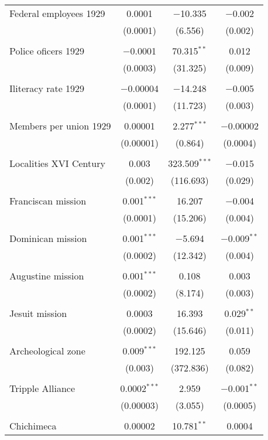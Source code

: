 \begin{table}[!htbp]
\begin{tabular}{@{\extracolsep{5pt}}lccc}
 Federal employees 1929 & 0.0001 & $-$10.335 & $-$0.002 \\ 
  & (0.0001) & (6.556) & (0.002) \\ 
  & & & \\ 
 Police oficers 1929 & $-$0.0001 & 70.315$^{**}$ & 0.012 \\ 
  & (0.0003) & (31.325) & (0.009) \\ 
  & & & \\ 
 Iliteracy rate 1929 & $-$0.00004 & $-$14.248 & $-$0.005 \\ 
  & (0.0001) & (11.723) & (0.003) \\ 
  & & & \\ 
 Members per union 1929 & 0.00001 & 2.277$^{***}$ & $-$0.00002 \\ 
  & (0.00001) & (0.864) & (0.0004) \\ 
  & & & \\ 
 Localities XVI Century & 0.003 & 323.509$^{***}$ & $-$0.015 \\ 
  & (0.002) & (116.693) & (0.029) \\ 
  & & & \\ 
 Franciscan mission & 0.001$^{***}$ & 16.207 & $-$0.004 \\ 
  & (0.0001) & (15.206) & (0.004) \\ 
  & & & \\ 
 Dominican mission & 0.001$^{***}$ & $-$5.694 & $-$0.009$^{**}$ \\ 
  & (0.0002) & (12.342) & (0.004) \\ 
  & & & \\ 
 Augustine mission & 0.001$^{***}$ & 0.108 & 0.003 \\ 
  & (0.0002) & (8.174) & (0.003) \\ 
  & & & \\ 
 Jesuit mission & 0.0003 & 16.393 & 0.029$^{**}$ \\ 
  & (0.0002) & (15.646) & (0.011) \\ 
  & & & \\ 
 Archeological zone & 0.009$^{***}$ & 192.125 & 0.059 \\ 
  & (0.003) & (372.836) & (0.082) \\ 
  & & & \\ 
 Tripple Alliance & 0.0002$^{***}$ & 2.959 & $-$0.001$^{**}$ \\ 
  & (0.00003) & (3.055) & (0.0005) \\ 
  & & & \\ 
 Chichimeca & 0.00002 & 10.781$^{**}$ & 0.0004 \\ 

\end{tabular}
\end{table}
